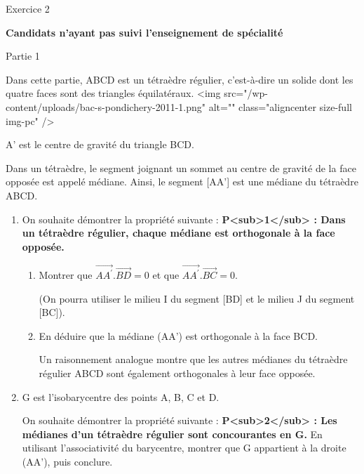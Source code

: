 
%
\begin{h2}Exercice 2\end{h2}
\textbf{Candidats n'ayant pas suivi l'enseignement de spécialité}
\begin{h3}Partie 1\end{h3}
Dans cette partie, ABCD est un tétraèdre régulier, c'est-à-dire un solide dont les quatre faces sont des triangles équilatéraux.
<img src="/wp-content/uploads/bac-s-pondichery-2011-1.png" alt="" class="aligncenter size-full  img-pc" />

\begin{center}
\end{center}
A' est le centre de gravité du triangle BCD.
\par
Dans un tétraèdre, le segment joignant un sommet au centre de gravité de la face opposée est appelé médiane. Ainsi, le segment [AA'] est une médiane du tétraèdre ABCD.
\begin{enumerate}
     \item
     On souhaite démontrer la propriété suivante :
     \textbf{P<sub>1</sub> : Dans un tétraèdre régulier, chaque médiane est orthogonale à la face opposée.}
     \begin{enumerate}
          \item
          Montrer que $\overrightarrow{AA^{\prime}} . \overrightarrow{BD}=0$ et que $\overrightarrow{AA^{\prime}} . \overrightarrow{BC}=0$.
          \par
          (On pourra utiliser le milieu I du segment [BD] et le milieu J du segment [BC]).
          \item
          En déduire que la médiane (AA') est orthogonale à la face BCD.
          \par
          Un raisonnement analogue montre que les autres médianes du tétraèdre régulier ABCD sont également orthogonales à leur face opposée.
     \end{enumerate}
     \item
     G est l'isobarycentre des points A, B, C et D.
     \par
     On souhaite démontrer la propriété suivante :
     \textbf{P<sub>2</sub> : Les médianes d'un tétraèdre régulier sont concourantes en G.}
     En utilisant l'associativité du barycentre, montrer que G appartient à la droite (AA'), puis conclure.
\end{enumerate}
